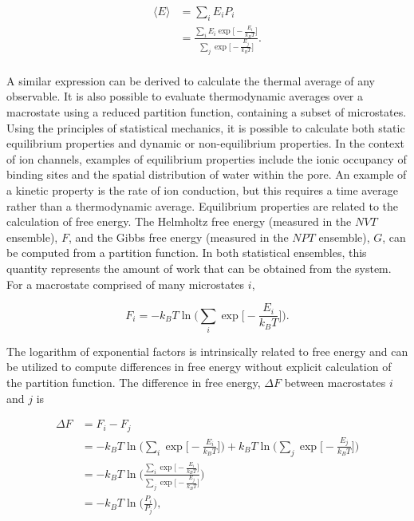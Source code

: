 \begin{refsection}
\begin{equation} 
\label{eq:2a}
\begin{split}
 \langle E \rangle & = \sum_i E_i P_i \\
                            & = \frac{ \sum_{i} E_{i} \exp \big[ - \frac{E_{i}}{k_B T} \big]  }{  \sum_{j} \exp \big[ - \frac{E_{j}}{k_B T} \big]  }. \\
\end{split}
\end{equation}

A similar expression can be derived to calculate the thermal average of any observable. It is also possible to evaluate thermodynamic averages over a macrostate using a reduced partition function, containing a subset of microstates. Using the principles of statistical mechanics, it is possible to calculate both static equilibrium properties and dynamic or non-equilibrium properties. In the context of ion channels, examples of equilibrium properties include the ionic occupancy of binding sites and the spatial distribution of water within the pore. An example of a kinetic property is the rate of ion conduction, but this requires a time average rather than a thermodynamic average. Equilibrium properties are related to the calculation of free energy. The Helmholtz free energy (measured in the $NVT$ ensemble), $F$, and the Gibbs free energy (measured in the $NPT$ ensemble), $G$, can be computed from a partition function. In both statistical ensembles, this quantity represents the amount of work that can be obtained from the system. For a macrostate comprised of many microstates $i$,

\begin{equation}
F_i = - k_B T \ln \Big( \sum_{i} \exp \big[ - \frac{E_{i}}{k_B T} \big]  \Big).
\end{equation}

The logarithm of exponential factors is intrinsically related to free energy and can be utilized to compute differences in free energy without explicit calculation of the partition function. The difference in free energy, $\Delta F$ between macrostates $i$ and $j$ is 

\begin{equation}
\begin{split}
\Delta F & = F_i - F_j \\
              & =  -k_B T \ln \Big( \sum_{i} \exp \big[ - \frac{E_{i}}{k_B T} \big]  \Big) + k_B T \ln \Big( \sum_{j} \exp \big[ - \frac{E_{j}}{k_B T} \big]  \Big)\\
              & = -k_B T \ln \Big( \frac{\sum_{i} \exp \big[ - \frac{E_{i}}{k_B T} \big]}{\sum_{j} \exp \big[ - \frac{E_{j}}{k_B T} \big]}                         \Big) \\ 
              & = -k_B T \ln \Big( \frac{P_i}{P_j} \Big),
\end{split}
\end{equation}


\end{refsection}
